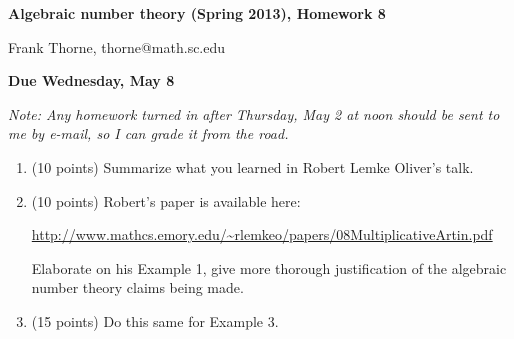 \documentclass[12pt]{article}
\begin{document}
\setlength{\topmargin}{-2mm}





\begin{center}{\bf Algebraic number theory (Spring 2013), Homework 8}
\end{center}
\begin{center}Frank Thorne, thorne@math.sc.edu
\end{center}
\begin{center}
{\bf Due Wednesday, May 8}
\end{center}

{\itshape Note: Any homework turned in after Thursday, May 2 at noon should be sent to me by e-mail,
so I can grade it from the road.}

\begin{enumerate}
\item (10 points)
Summarize what you learned in Robert Lemke Oliver's talk.

\item (10 points)
Robert's paper is available here:
\begin{center}
\url{http://www.mathcs.emory.edu/~rlemkeo/papers/08MultiplicativeArtin.pdf}
\end{center}
Elaborate on his Example 1, give more thorough justification of the algebraic number theory claims being made.

\item (15 points)
Do this same for Example 3.

\end{enumerate}
\end{document}
